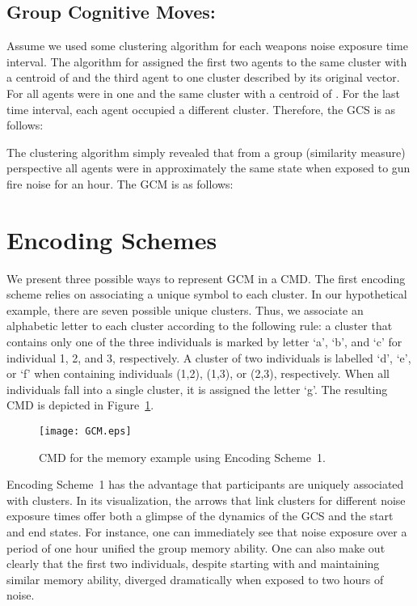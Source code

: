 \documentclass[conference]{IEEEtran}
\begin{document}
\subsection{Group Cognitive Moves:}

Assume we used some clustering algorithm for each weapons noise exposure time interval. The
algorithm for  assigned the first two agents to the same cluster with a centroid of  and the third agent to one cluster described by its original vector. For  all agents
were in one and the same cluster with a centroid of . For the last time interval,
each agent occupied a different cluster. Therefore, the GCS is as follows:







The clustering algorithm simply revealed that from a group (similarity measure) perspective all
agents were in approximately the same state when exposed to gun fire noise for an hour. The GCM is
as follows:



\section{Encoding Schemes}

We present three possible ways to represent GCM in a CMD. The first encoding scheme relies on
associating a unique symbol to each cluster. In our hypothetical example, there are seven possible
unique clusters. Thus, we associate an alphabetic letter to each cluster according to the following
rule: a cluster that contains only one of the three individuals is marked by letter `a', `b', and
`c' for individual 1, 2, and 3, respectively. A cluster of two individuals is labelled `d', `e', or
`f' when containing individuals (1,2), (1,3), or (2,3), respectively. When all individuals fall
into a single cluster, it is assigned the letter `g'. The resulting CMD is depicted in
Figure~\ref{fig:cmd1}.

\begin{figure}[!t]
\centering
\texttt{[image: GCM.eps]}
\caption{CMD for the memory example using Encoding Scheme~1.} \label{fig:cmd1}
\end{figure}

Encoding Scheme~1 has the advantage that participants are uniquely associated with clusters. In its
visualization, the arrows that link clusters for different noise exposure times offer both a
glimpse of the dynamics of the GCS and the start and end states. For instance, one can immediately
see that noise exposure over a period of one hour unified the group memory ability. One can also
make out clearly that the first two individuals, despite starting with and maintaining similar
memory ability, diverged dramatically when exposed to two hours of noise.
\end{document}
